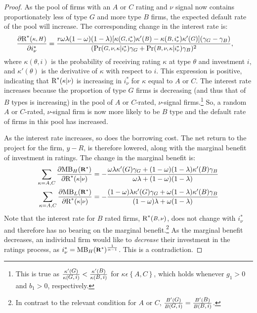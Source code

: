 \documentclass[titlepage]{article}
\begin{document}
\begin{proof}
As the pool of firms with an $A$ or $C$ rating and $\nu$ signal now contains proportionately less of type $G$ and more type $B$ firms, the expected default rate of the pool will increase. The corresponding change in the interest rate is:
\begin{align}
\frac{\partial \textup{R}^{*}(\medmath{\kappa,H})}{\partial i^{*}_{\nu}} &= 
\frac{r\omega\lambda(1-\omega)(1-\lambda)[\kappa(\medmath{G,i^{*}_{\nu}})\kappa' (\medmath{B})-\kappa (\medmath{B,i^{*}_{\nu}})\kappa' (\medmath{G})](\gamma_{G}-\gamma_{B})}{(\textup{Pr}(\medmath{G,\nu,\kappa}|\medmath{i^{*}_{\nu}})\gamma_G + \textup{Pr}(\medmath{B,\nu,\kappa}|\medmath{i^{*}_{\nu}})\gamma_B)^2},
\end{align}
where $\kappa(\theta,i)$ is the probability of receiving rating $\kappa$ at type $\theta$ and investment $i$, and $\kappa'(\theta)$ is the derivative of $\kappa$ with respect to $i$. This expression is positive, indicating that $\textup{R}^{*}(\medmath{\kappa}|\medmath{\nu})$ is increasing in $i^{*}_{\nu}$ for $\kappa$ equal to $A$ or $C$. The interest rate increases because the proportion of type $G$ firms is decreasing (and thus that of $B$ types is increasing) in the pool of $A$ or $C$-rated, $\nu$-signal firms.\footnote{This is true as $\frac{\kappa'(\medmath{G})}{\kappa(\medmath{G,i})}<\frac{\kappa'(\medmath{B})}{\kappa(\medmath{B,i})}$ for $\kappa\epsilon\left\{A,C\right\}$, which holds whenever $g_{1}>0$ and $b_{1}>0$, respectively.} So, a random $A$ or $C$-rated, $\nu$-signal firm is now more likely to be $B$ type and the default rate of firms in this pool has increased.

As the interest rate increases, so does the borrowing cost. The net return to the project for the firm, $y-R$, is therefore lowered, along with the marginal benefit of investment in ratings. The change in the marginal benefit is:
\begin{align}
\sum_{\kappa = A,C}\frac{\partial \textup{MB}_{H}(\medmath{\mathbf{R^{*}}})}{\partial \textup{R}^{*}(\medmath{\kappa}|\medmath{\nu})} &= -\frac{\omega\lambda\kappa'(G)\gamma_{G}+(1-\omega)(1-\lambda)\kappa'(B)\gamma_B}{\omega\lambda + (1-\omega)(1-\lambda)}\\
\sum_{\kappa = A,C}\frac{\partial \textup{MB}_{L}(\medmath{\mathbf{R^{*}}})}{\partial \textup{R}^{*}(\medmath{\kappa}|\medmath{\nu})} &= -\frac{(1-\omega)\lambda\kappa'(G)\gamma_{G}+\omega(1-\lambda)\kappa'(B)\gamma_B}{(1-\omega)\lambda + \omega(1-\lambda)}
\end{align}
Note that the interest rate for $B$ rated firms, $\textup{R}^{*}(\medmath{B,\nu})$, does not change with $i^{*}_{\nu}$ and therefore has no bearing on the marginal benefit.\footnote{In contrast to the relevant condition for $A$ or $C$, $\frac{B'(\medmath{G})}{B(\medmath{G,i})}=\frac{B'(\medmath{B})}{B(\medmath{B,i})}$.} As the marginal benefit decreases, an individual firm would like to \emph{decrease} their investment in the ratings process, as $i^{*}_{\nu}=\textup{MB}_{H}(\medmath{\mathbf{R^{*}}})^{\frac{1}{\alpha-1}}$. This is a contradiction.
\end{proof}
\end{document}
